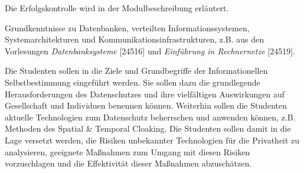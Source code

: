 \begin{course}

\setdoclanguagegerman
{}



\coursehead


\label{cour_7393.dp_997}


\begin{styleenv}
\begin{assessment}
Die Erfolgskontrolle wird in der Modulbeschreibung erläutert.


\end{assessment}

\begin{conditions}Grundkenntnisse zu Datenbanken, verteilten Informationssystemen, Systemarchitekturen und Kommunikationsinfrastrukturen, z.B. aus den Vorlesungen \emph{Datenbanksysteme }[24516] und \emph{Einführung in Rechnernetze} [24519].

\end{conditions}


\end{styleenv}

\begin{learningoutcomes}
Die Studenten sollen in die Ziele und Grundbegriffe der Informationellen Selbstbestimmung eingeführt werden. Sie sollen dazu die grundlegende Herausforderungen des Datenschutzes und ihre vielfältigen Auswirkungen auf Gesellschaft und Individuen benennen können. Weiterhin sollen die Studenten aktuelle Technologien zum Datenschutz beherrschen und anwenden können, z.B. Methoden des Spatial \& Temporal Cloaking. Die Studenten sollen damit in die Lage versetzt werden, die Risiken unbekannter Technologien für die Privatheit zu analysieren, geeignete Maßnahmen zum Umgang mit diesen Risiken vorzuschlagen und die Effektivität dieser Maßnahmen abzuschätzen.



\end{learningoutcomes}
\end{course}
